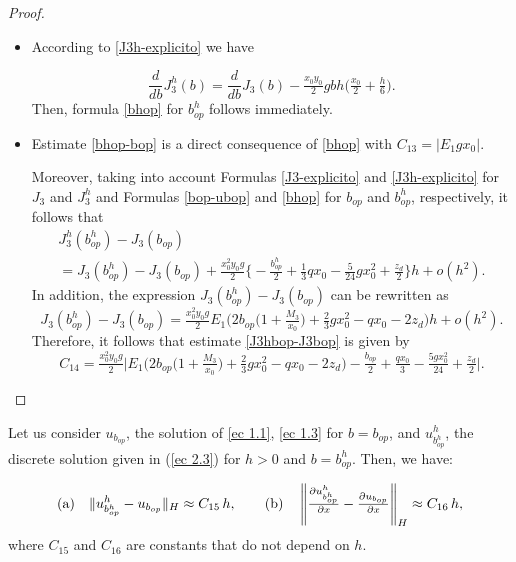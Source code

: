 \documentclass[axioms,article,submit,moreauthors]{Definitions/mdpi}
\newcommand\pder[2][]{\ensuremath{\tfrac{\partial#1}{\partial#2}}}
\begin{document}
\begin{proof} $ $

\begin{itemize}
\item[(a)] According to \eqref{J3h-explicito} we have

  \begin{equation}\label{J3h-derivada}
{ \frac{d}{db}J^h_{3}} (b)= \frac{d}{db} J_3(b) -\tfrac{x_0 y_0 }{2} g  b h  \Big( \tfrac{x_0}{2} + \tfrac{h}{6}  \Big) .
\end{equation}
Then, formula \eqref{bhop} for ${b^h_{op}}$ follows immediately.

\item[(b)] Estimate \eqref{bhop-bop}  is a direct consequence of \eqref{bhop} with $C_{13}=|E_1 g x_0|$. 

Moreover, taking into account Formulas \eqref{J3-explicito} and \eqref{J3h-explicito} for $J_3$ and ${J^h_{3}}$ and Formulas \eqref{bop-ubop} and \eqref{bhop} for $b_{op}$ and ${b^h_{op}}$, respectively, it follows that
\[\begin{array}{l}
{J^h_{3}} ({b^h_{op}})- J_3(b_{op})\\[0.45cm]
=J_{3} ({b^h_{op}})- J_3(b_{op}) +\tfrac{x_0^2 y_0 g}{2} \Big\{ - \tfrac{{b^h_{op}}}{2} + \tfrac{1}{3} q x_0-\tfrac{5}{24} g x_0^2+\tfrac{z_d}{2} \Big\} h+ o(h^2).
\end{array}
\]
In addition, the expression  $J_{3} ({b^h_{op}})- J_3(b_{op})$ can be rewritten as
\[
J_{3} ({b^h_{op}})- J_3(b_{op})=\tfrac{x_0^2 y_0 g }{2} E_1   \Big( 2b_{op} \Big(1+ \tfrac{M_3}{x_0} \Big)+\tfrac{2}{3} g x_0^2-q x_0-2 z_d\Big)h+o(h^2).
\]
Therefore, it follows that estimate \eqref{J3hbop-J3bop} is given by  
 \[ C_{14}=  \tfrac{x_0^2  y_0 g}{2} \Big\lvert E_1  \Big( 2b_{op} \Big(1+ \tfrac{M_3}{x_0} \Big)+\tfrac{2}{3} g x_0^2-q x_0-2 z_d\Big)-\tfrac{b_{op}}{2} + \tfrac{q x_0}{3} - \tfrac{5 g x_0^2}{24}+ \tfrac{z_d}{2}\Big \rvert  \textbf{.}\]
\end{itemize}
\end{proof}
            

\begin{Lemma} Let us consider $u_{b_{op}}$, the solution of \eqref{ec 1.1}, \eqref{ec 1.3} for $b= b_{op}$, and
		${ u^h_{b^h_{op}}}$, the discrete solution  given in (\ref{ec 2.3}) for  $h>0$ and $b={b^h_{op}}.$ Then, we have:
						
	 \begin{equation}  \label{difu-problema3} {\rm (a)} \quad  			      
  				  \lVert {u^h_{b^h_{op}}} - u_{b_{op}}  \rVert _H \approx C_{15}\, h,
  \quad \quad
     {\rm (b)}\quad
        \left\lVert \pder[{u^h_{b^h_{op}}}]{x} - \pder[u_{b_{op}}]{x} \right\rVert _H \approx C_{16} \,h,
\end{equation}
where $C_{15}$ and $C_{16}$ are constants that do not depend on $h$.
   \end{Lemma}   
    
\end{document}
